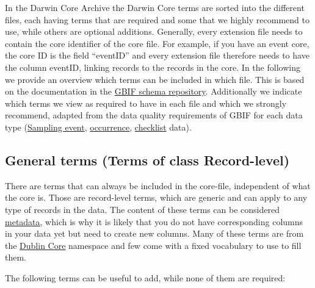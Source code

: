 \documentclass[
  oneside]{book}
\begin{document}
In the Darwin Core Archive the Darwin Core terms are sorted into the different files, each having terms that are required and some that we highly recommend to use, while others are optional additions. Generally, every extension file needs to contain the core identifier of the core file. For example, if you have an event core, the core ID is the field ``eventID'' and every extension file therefore needs to have the column eventID, linking records to the records in the core. In the following we provide an overview which terms can be included in which file. This is based on the documentation in the \href{https://rs.gbif.org/extensions.html}{GBIF schema repository}. Additionally we indicate which terms we view as required to have in each file and which we strongly recommend, adapted from the data quality requirements of GBIF for each data type (\href{https://www.gbif.org/data-quality-requirements-sampling-events}{Sampling event}, \href{https://www.gbif.org/data-quality-requirements-occurrences}{occurrence}, \href{https://www.gbif.org/data-quality-requirements-checklists}{checklist} data).

\subsection{General terms (Terms of class Record-level)}\label{general-terms-terms-of-class-record-level}

There are terms that can always be included in the core-file, independent of what the core is. Those are record-level terms, which are generic and can apply to any type of records in the data. The content of these terms can be considered \hyperref[metadata]{metadata}, which is why it is likely that you do not have corresponding columns in your data yet but need to create new columns. Many of these terms are from the \hyperref[dublincore]{Dublin Core} namespace and few come with a fixed vocabulary to use to fill them.

The following terms can be useful to add, while none of them are required:
\end{document}
